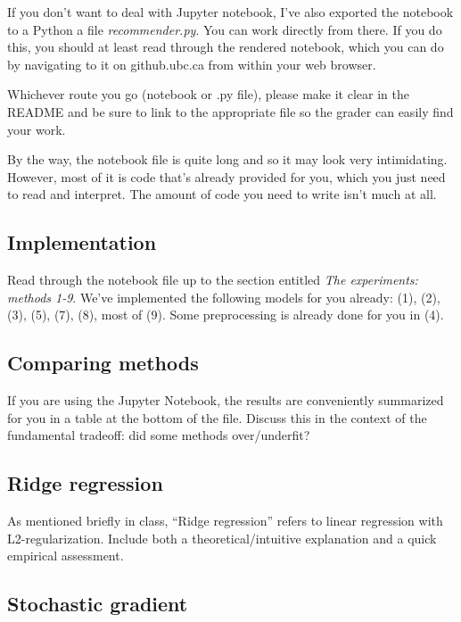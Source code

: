 \documentclass{article}
\begin{document}
If you don't want to deal with Jupyter notebook, I've also exported the notebook
to a Python a file
\emph{recommender.py}. You can work directly from there.
If you do this, you should at least read through the rendered notebook,
which you can do by navigating to it on github.ubc.ca from within your web browser. 

Whichever route you go (notebook or .py file), please make it clear in the README
and be sure to link to the appropriate file so the grader can easily find your work.

By the way, the notebook file is quite long and so it may look very intimidating.
However, most of it is code that's already provided for you, which you just need to read and interpret.
The amount of code you need to write isn't much at all.

\subsection{Implementation}

Read through the notebook file up to the section entitled \emph{The experiments: methods 1-9}. 
We've implemented the following models for you already: (1), (2), (3), (5), (7), (8), most of (9). 
 Some preprocessing is already done for you in (4).

\subsection{Comparing methods}

If you are using the Jupyter Notebook, the results are conveniently summarized for you 
in a table at the bottom of the file.
Discuss this in the context of the fundamental tradeoff: did some methods over/underfit?


\subsection{Ridge regression}

As mentioned briefly in class, ``Ridge regression'' refers to linear regression with L2-regularization. 
Include both a theoretical/intuitive explanation and a quick empirical assessment.

\subsection{Stochastic gradient}
\end{document}
